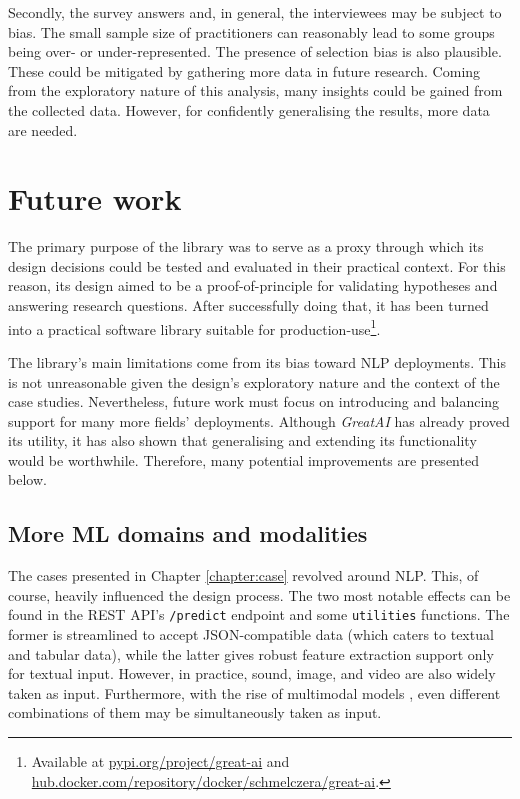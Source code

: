 Secondly, the survey answers and, in general, the interviewees may be subject to bias. The small sample size of practitioners can reasonably lead to some groups being over- or under-represented. The presence of selection bias is also plausible. These could be mitigated by gathering more data in future research. Coming from the exploratory nature of this analysis, many insights could be gained from the collected data. However, for confidently generalising the results, more data are needed.

\section{Future work} 

The primary purpose of the library was to serve as a proxy through which its design decisions could be tested and evaluated in their practical context. For this reason, its design aimed to be a proof-of-principle for validating hypotheses and answering research questions. After successfully doing that, it has been turned into a practical software library suitable for production-use\footnote{Available at \href{https://pypi.org/project/great-ai/}{pypi.org/project/great-ai} and \href{https://hub.docker.com/repository/docker/schmelczera/great-ai}{hub.docker.com/repository/docker/schmelczera/great-ai}.}. 
  
The library's main limitations come from its bias toward NLP deployments. This is not unreasonable given the design's exploratory nature and the context of the case studies. Nevertheless, future work must focus on introducing and balancing support for many more fields' deployments. Although \textit{GreatAI} has already proved its utility, it has also shown that generalising and extending its functionality would be worthwhile. Therefore, many potential improvements are presented below.

\subsection{More ML domains and modalities}

The cases presented in Chapter \ref{chapter:case} revolved around NLP. This, of course, heavily influenced the design process. The two most notable effects can be found in the REST API's \texttt{/predict} endpoint and some \texttt{utilities} functions. The former is streamlined to accept JSON-compatible data (which caters to textual and tabular data), while the latter gives robust feature extraction support only for textual input. However, in practice, sound, image, and video are also widely taken as input. Furthermore, with the rise of multimodal models \cite{gao2020survey}, even different combinations of them may be simultaneously taken as input.

